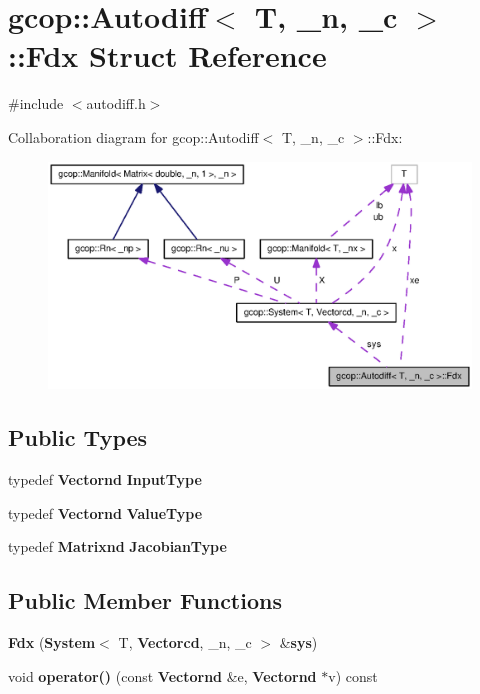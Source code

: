 \section{gcop\-:\-:\-Autodiff$<$ \-T, \-\_\-n, \-\_\-c $>$\-:\-:\-Fdx \-Struct \-Reference}
\label{structgcop_1_1Autodiff_1_1Fdx}


{\ttfamily \#include $<$autodiff.\-h$>$}



\-Collaboration diagram for gcop\-:\-:\-Autodiff$<$ \-T, \-\_\-n, \-\_\-c $>$\-:\-:\-Fdx\-:\nopagebreak
\begin{figure}[H]
\begin{center}
\leavevmode
\includegraphics[width=350pt]{structgcop_1_1Autodiff_1_1Fdx__coll__graph}
\end{center}
\end{figure}
\subsection*{\-Public \-Types}
\begin{DoxyCompactItemize}
\item 
typedef {\bf \-Vectornd} {\bf \-Input\-Type}
\item 
typedef {\bf \-Vectornd} {\bf \-Value\-Type}
\item 
typedef {\bf \-Matrixnd} {\bf \-Jacobian\-Type}
\end{DoxyCompactItemize}
\subsection*{\-Public \-Member \-Functions}
\begin{DoxyCompactItemize}
\item 
{\bf \-Fdx} ({\bf \-System}$<$ \-T, {\bf \-Vectorcd}, \-\_\-n, \-\_\-c $>$ \&{\bf sys})
\item 
void {\bf operator()} (const {\bf \-Vectornd} \&e, {\bf \-Vectornd} $\ast$v) const 
\end{DoxyCompactItemize}
